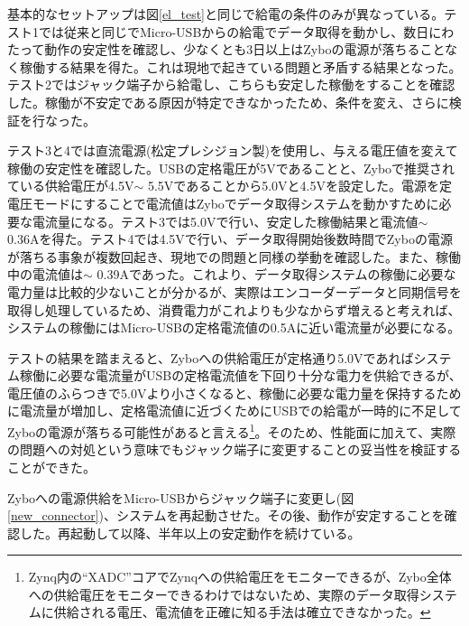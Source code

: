 基本的なセットアップは図\ref{el_test}と同じで給電の条件のみが異なっている。テスト1では従来と同じでMicro-USBからの給電でデータ取得を動かし、数日にわたって動作の安定性を確認し、少なくとも3日以上はZyboの電源が落ちることなく稼働する結果を得た。これは現地で起きている問題と矛盾する結果となった。テスト2ではジャック端子から給電し、こちらも安定した稼働をすることを確認した。稼働が不安定である原因が特定できなかったため、条件を変え、さらに検証を行なった。

テスト3と4では直流電源(松定プレシジョン製)を使用し、与える電圧値を変えて稼働の安定性を確認した。USBの定格電圧が5Vであることと、Zyboで推奨されている供給電圧が4.5V$\sim$ 5.5Vであることから5.0Vと4.5Vを設定した。電源を定電圧モードにすることで電流値はZyboでデータ取得システムを動かすために必要な電流量になる。テスト3では5.0Vで行い、安定した稼働結果と電流値$\sim$ 0.36Aを得た。テスト4では4.5Vで行い、データ取得開始後数時間でZyboの電源が落ちる事象が複数回起き、現地での問題と同様の挙動を確認した。また、稼働中の電流値は$\sim$ 0.39Aであった。これより、データ取得システムの稼働に必要な電力量は比較的少ないことが分かるが、実際はエンコーダーデータと同期信号を取得し処理しているため、消費電力がこれよりも少なからず増えると考えれば、システムの稼働にはMicro-USBの定格電流値の0.5Aに近い電流量が必要になる。

テストの結果を踏まえると、Zyboへの供給電圧が定格通り5.0Vであればシステム稼働に必要な電流量がUSBの定格電流値を下回り十分な電力を供給できるが、電圧値のふらつきで5.0Vより小さくなると、稼働に必要な電力量を保持するために電流量が増加し、定格電流値に近づくためにUSBでの給電が一時的に不足してZyboの電源が落ちる可能性があると言える\footnote{Zynq内の``XADC''コアでZynqへの供給電圧をモニターできるが、Zybo全体への供給電圧をモニターできるわけではないため、実際のデータ取得システムに供給される電圧、電流値を正確に知る手法は確立できなかった。}。そのため、性能面に加えて、実際の問題への対処という意味でもジャック端子に変更することの妥当性を検証することができた。

Zyboへの電源供給をMicro-USBからジャック端子に変更し(図\ref{new_connector})、システムを再起動させた。その後、動作が安定することを確認した。再起動して以降、半年以上の安定動作を続けている。

